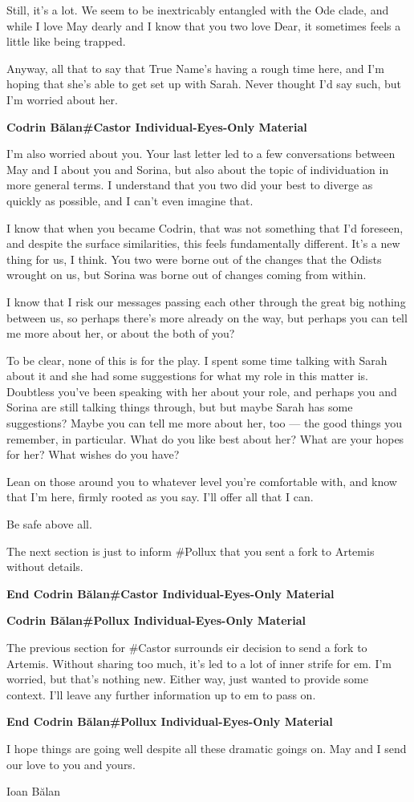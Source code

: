 Still, it's a lot. We seem to be inextricably entangled with the Ode clade, and while I love May dearly and I know that you two love Dear, it sometimes feels a little like being trapped.

Anyway, all that to say that True Name's having a rough time here, and I'm hoping that she's able to get set up with Sarah. Never thought I'd say such, but I'm worried about her.

\textbf{Codrin Bălan\#Castor Individual-Eyes-Only Material}

I'm also worried about you. Your last letter led to a few conversations between May and I about you and Sorina, but also about the topic of individuation in more general terms. I understand that you two did your best to diverge as quickly as possible, and I can't even imagine that.

I know that when you became Codrin, that was not something that I'd foreseen, and despite the surface similarities, this feels fundamentally different. It's a new thing for us, I think. You two were borne out of the changes that the Odists wrought on us, but Sorina was borne out of changes coming from within.

I know that I risk our messages passing each other through the great big nothing between us, so perhaps there's more already on the way, but perhaps you can tell me more about her, or about the both of you?

To be clear, none of this is for the play. I spent some time talking with Sarah about it and she had some suggestions for what my role in this matter is. Doubtless you've been speaking with her about your role, and perhaps you and Sorina are still talking things through, but but maybe Sarah has some suggestions? Maybe you can tell me more about her, too — the good things you remember, in particular. What do you like best about her? What are your hopes for her? What wishes do you have?

Lean on those around you to whatever level you're comfortable with, and know that I'm here, firmly rooted as you say. I'll offer all that I can.

Be safe above all.

The next section is just to inform \#Pollux that you sent a fork to Artemis without details.

\textbf{End Codrin Bălan\#Castor Individual-Eyes-Only Material}

\textbf{Codrin Bălan\#Pollux Individual-Eyes-Only Material}

The previous section for \#Castor surrounds eir decision to send a fork to Artemis. Without sharing too much, it's led to a lot of inner strife for em. I'm worried, but that's nothing new. Either way, just wanted to provide some context. I'll leave any further information up to em to pass on.

\textbf{End Codrin Bălan\#Pollux Individual-Eyes-Only Material}

I hope things are going well despite all these dramatic goings on. May and I send our love to you and yours.

Ioan Bălan
